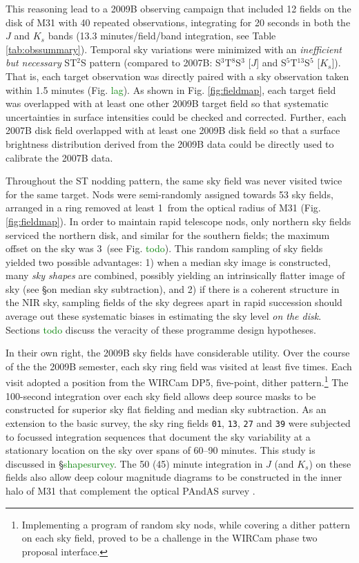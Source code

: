 \documentclass[iop]{emulateapj}
\newcommand{\todo}[1]{\textcolor{green}{#1}}
\begin{document}
This reasoning lead to a 2009B observing campaign that included 12 fields on the disk of M31 with 40 repeated observations, integrating for 20 seconds in both the $J$ and $K_s$ bands (13.3 minutes/field/band integration, see Table \ref{tab:obssummary}). Temporal sky variations were minimized with an \emph{inefficient but necessary} ST$^2$S pattern (compared to 2007B: S$^3$T$^8$S$^3$ [$J$] and S$^5$T$^{13}$S$^5$ [$K_s$]). That is, each target observation was directly paired with a sky observation taken within 1.5 minutes (Fig. \todo{lag}). As shown in Fig. \ref{fig:fieldmap}, each target field was overlapped with at least one other 2009B target field so that systematic uncertainties in surface intensities could be checked and corrected. Further, each 2007B disk field overlapped with at least one 2009B disk field so that a surface brightness distribution derived from the 2009B data could be directly used to calibrate the 2007B data.

Throughout the ST nodding pattern, the same sky field was never visited twice for the same target. Nods were semi-randomly assigned towards 53 sky fields, arranged in a ring removed at least 1\arcdeg\ from the optical radius of M31 (Fig. \ref{fig:fieldmap}). In order to maintain rapid telescope nods, only northern sky fields serviced the northern disk, and similar for the southern fields; the maximum offset on the sky was 3\arcdeg\ (see Fig. \todo{todo}). This random sampling of sky fields yielded two possible advantages: 1) when a median sky image is constructed, many \emph{sky shapes} are combined, possibly yielding an intrinsically flatter image of sky (see \S on median sky subtraction), and 2) if there is a coherent structure in the NIR sky, sampling fields of the sky degrees apart in rapid succession should average out these systematic biases in estimating the sky level \emph{on the disk}. Sections \todo{todo} discuss the veracity of these programme design hypotheses.

In their own right, the 2009B sky fields have considerable utility. Over the course of the the 2009B semester, each sky ring field was visited at least five times. Each visit adopted a position from the WIRCam DP5, five-point, dither pattern.\footnote{Implementing a program of random sky nods, while covering a dither pattern on each sky field, proved to be a challenge in the WIRCam phase two proposal interface.} The 100-second integration over each sky field allows deep source masks to be constructed for superior sky flat fielding and median sky subtraction. As an extension to the basic survey, the sky ring fields \texttt{01}, \texttt{13}, \texttt{27} and \texttt{39} were subjected to focussed integration sequences that document the sky variability at a stationary location on the sky over spans of 60--90 minutes. This study is discussed in \S \todo{shapesurvey}. The 50 (45) minute integration in $J$ (and $K_s$) on these fields also allow deep colour magnitude diagrams to be constructed in the inner halo of M31 that complement the optical PAndAS survey \cite{Ibata:2007}.
\end{document}
